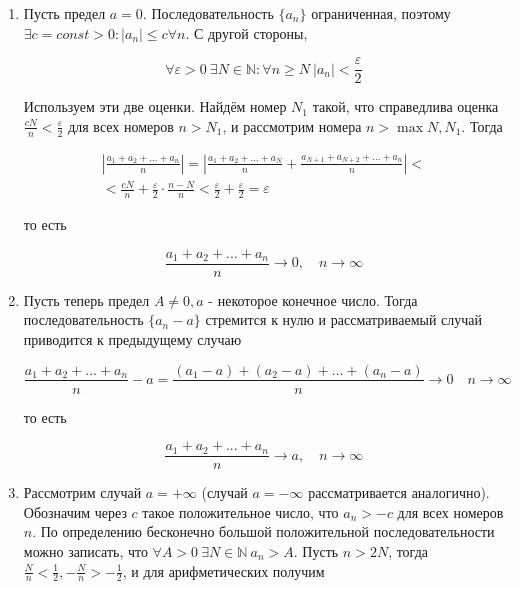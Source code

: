 \begin{enumerate}
	\item Пусть предел $a = 0$. Последовательность $\{a_n\}$ ограниченная, поэтому $\exists c =const > 0: |a_n| \leqslant c \forall n$. С другой стороны,
	
	\begin{equation*}
		\forall\varepsilon > 0\ \exists N\in\mathbb{N}: \forall n \geqslant N\ |a_n| < \frac{\varepsilon}{2}
	\end{equation*}
	
	Используем эти две оценки. Найдём номер  $N_1$ такой, что справедлива оценка {\small $\frac{cN}{n} < \frac{\varepsilon}{2}$} для всех номеров $n > N_1$, и рассмотрим номера $n > \max{N, N_1}$. Тогда
	
	\begin{equation*}
		\begin{gathered}
			\left| \frac{a_1 + a_2 + ... + a_n}{n} \right| = \left| \frac{a_1 + a_2 + ... + a_N}{n} + \frac{a_{N + 1} + a_{N + 2} + ... + a_n}{n} \right| < \\
			< \frac{cN}{n} + \frac{\varepsilon}{2} \cdot \frac{n - N}{n} < \frac{\varepsilon}{2} + \frac{\varepsilon}{2} = \varepsilon
		\end{gathered}
	\end{equation*}
	
	то есть
	
	\begin{equation*}
		\frac{a_1 + a_2 + ... + a_n}{n} \rightarrow 0,\quad n\rightarrow \infty
	\end{equation*}
	
	\item Пусть теперь предел $A \neq 0, a$ - некоторое конечное число. Тогда последовательность $\{a_n - a\}$ стремится к нулю и рассматриваемый случай приводится к предыдущему случаю
	
	\begin{equation*}
		\frac{a_1 + a_2 + ... + a_n}{n}  - a = \frac{(a_1 - a) + (a_2 - a) + ... + (a_n - a)}{n} \rightarrow 0\quad n \rightarrow \infty
	\end{equation*}
	
	то есть
	
	\begin{equation*}
		\frac{a_1 + a_2 + ... + a_n}{n}  \rightarrow a,\quad n\rightarrow \infty
	\end{equation*}
	
	\item Рассмотрим случай $a = + \infty$ (случай $a = - \infty$ рассматривается аналогично). Обозначим через $c$ такое положительное число, что $a_n > -c$ для всех номеров $n$. По определению бесконечно большой положительной последовательности можно записать, что $\forall A > 0\ \exists N \in \mathbb{N}\ a_n > A$. Пусть $n > 2N$, тогда $\frac{N}{n} < \frac{1}{2}, -\frac{N}{n} > -\frac{1}{2}$, и для арифметических получим
	

\end{enumerate}
